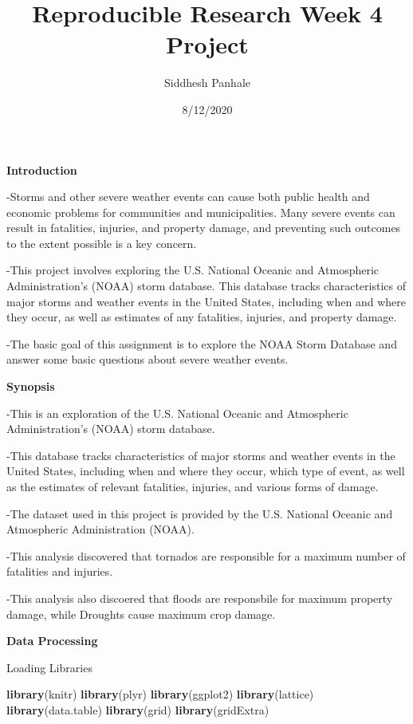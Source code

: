 \documentclass[
]{article}
\title{Reproducible Research Week 4 Project}
\author{Siddhesh Panhale}
\date{8/12/2020}
\newenvironment{Shaded}{\begin{snugshade}}{\end{snugshade}}
\newcommand{\KeywordTok}[1]{\textcolor[rgb]{0.13,0.29,0.53}{\textbf{#1}}}
\newcommand{\NormalTok}[1]{#1}
\begin{document}
\maketitle

\textbf{Introduction}

-Storms and other severe weather events can cause both public health and
economic problems for communities and municipalities. Many severe events
can result in fatalities, injuries, and property damage, and preventing
such outcomes to the extent possible is a key concern.

-This project involves exploring the U.S. National Oceanic and
Atmospheric Administration's (NOAA) storm database. This database tracks
characteristics of major storms and weather events in the United States,
including when and where they occur, as well as estimates of any
fatalities, injuries, and property damage.

-The basic goal of this assignment is to explore the NOAA Storm Database
and answer some basic questions about severe weather events.

\textbf{Synopsis}

-This is an exploration of the U.S. National Oceanic and Atmospheric
Administration's (NOAA) storm database.

-This database tracks characteristics of major storms and weather events
in the United States, including when and where they occur, which type of
event, as well as the estimates of relevant fatalities, injuries, and
various forms of damage.

-The dataset used in this project is provided by the U.S. National
Oceanic and Atmospheric Administration (NOAA).

-This analysis discovered that tornados are responsible for a maximum
number of fatalities and injuries.

-This analysis also discoered that floods are responsbile for maximum
property damage, while Droughts cause maximum crop damage.

\textbf{Data Processing}

Loading Libraries

\begin{Shaded}
\begin{Highlighting}[]
\KeywordTok{library}\NormalTok{(knitr)}
\KeywordTok{library}\NormalTok{(plyr)}
\KeywordTok{library}\NormalTok{(ggplot2)}
\KeywordTok{library}\NormalTok{(lattice)}
\KeywordTok{library}\NormalTok{(data.table)}
\KeywordTok{library}\NormalTok{(grid)}
\KeywordTok{library}\NormalTok{(gridExtra)}
\end{Highlighting}
\end{Shaded}
\end{document}
